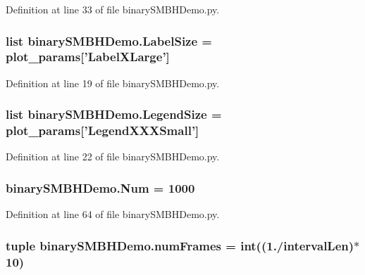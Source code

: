 Definition at line 33 of file binary\-S\-M\-B\-H\-Demo.\-py.

\hypertarget{namespacebinary_s_m_b_h_demo_a5442484cb46fea21b591857bb4612fd0}{
\subsubsection[{Label\-Size}]{\setlength{\rightskip}{0pt plus 5cm}list binary\-S\-M\-B\-H\-Demo.\-Label\-Size = plot\-\_\-params\mbox{[}'Label\-X\-Large'\mbox{]}}}\label{namespacebinary_s_m_b_h_demo_a5442484cb46fea21b591857bb4612fd0}


Definition at line 19 of file binary\-S\-M\-B\-H\-Demo.\-py.

\hypertarget{namespacebinary_s_m_b_h_demo_a37d5e999bcb090b558ab98425ea058f2}{
\subsubsection[{Legend\-Size}]{\setlength{\rightskip}{0pt plus 5cm}list binary\-S\-M\-B\-H\-Demo.\-Legend\-Size = plot\-\_\-params\mbox{[}'Legend\-X\-X\-X\-Small'\mbox{]}}}\label{namespacebinary_s_m_b_h_demo_a37d5e999bcb090b558ab98425ea058f2}


Definition at line 22 of file binary\-S\-M\-B\-H\-Demo.\-py.

\hypertarget{namespacebinary_s_m_b_h_demo_a20af80bc8ad6317c9f48f3c8974ae34e}{
\subsubsection[{Num}]{\setlength{\rightskip}{0pt plus 5cm}binary\-S\-M\-B\-H\-Demo.\-Num = 1000}}\label{namespacebinary_s_m_b_h_demo_a20af80bc8ad6317c9f48f3c8974ae34e}


Definition at line 64 of file binary\-S\-M\-B\-H\-Demo.\-py.

\hypertarget{namespacebinary_s_m_b_h_demo_a2a395de684eed7859ba5e04338595253}{
\subsubsection[{num\-Frames}]{\setlength{\rightskip}{0pt plus 5cm}tuple binary\-S\-M\-B\-H\-Demo.\-num\-Frames = int((1./{\bf interval\-Len})$\ast$10)}}\label{namespacebinary_s_m_b_h_demo_a2a395de684eed7859ba5e04338595253}



